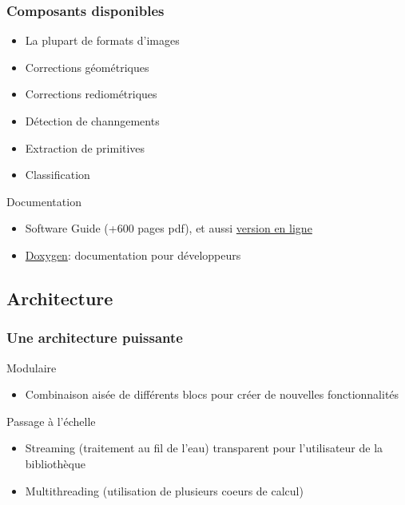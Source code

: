 \documentclass[compress]{beamer}
\begin{document}
\begin{frame}
\frametitle{Composants disponibles}
 \begin{block}{}
\scriptsize
\begin{itemize}
\item La plupart de formats d'images
\item Corrections géométriques
\item Corrections rediométriques
\item Détection de channgements
\item Extraction de primitives
\item Classification
\end{itemize}
\end{block}


 \begin{block}{Documentation}
\scriptsize
\begin{itemize}
\item Software Guide (+600 pages pdf), et aussi
  \href{http://www.orfeo-toolbox.org/SoftwareGuide/}{version en ligne}
\item \href{http://www.orfeo-toolbox.org/doxygen}{Doxygen}:
  documentation pour développeurs
\end{itemize}
\end{block}
\end{frame}

\subsection{Architecture}

\begin{frame}
 \frametitle{Une architecture puissante}
  \begin{block}{Modulaire}
\scriptsize
\begin{itemize}
\item Combinaison aisée de différents blocs pour créer de nouvelles fonctionnalités
\end{itemize}
\end{block}
  \begin{block}{Passage à l'échelle}
\scriptsize
\begin{itemize}
\item Streaming (traitement au fil de l'eau) transparent pour
  l'utilisateur de la bibliothèque
\item Multithreading (utilisation de plusieurs coeurs de calcul) 
\end{itemize}
\end{block}
\end{frame}
\end{document}
